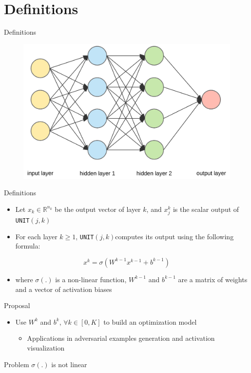 \documentclass{beamer}
\newcommand{\UNIT}{\texttt{UNIT}$(j,k)$}
\begin{document}
\section{Definitions}
\begin{frame}{Definitions}
  \begin{figure}
    \centering
    \includegraphics[width=\columnwidth]{dnn.png}
  \end{figure}
\end{frame}

\begin{frame}{Definitions}
  \begin{itemize}
  \item Let $x_k \in \mathbb{R}^{n_k}$ be the output vector of layer $k$, and $x_j^k$ is the scalar output of \UNIT
  \item For each layer $k \geq 1$, \UNIT computes its output using the following formula:
  \end{itemize}
  $$
  x^k = \sigma(W^{k-1} x^{k-1} + b^{k-1})
  $$
  \begin{itemize}
  \item where $\sigma(.)$ is a non-linear function, $W^{k-1}$ and $b^{k-1}$ are a matrix of weights and a vector of activation biases
  \end{itemize}
\end{frame}

\begin{frame}{Proposal}
  \begin{itemize}
  \item Use $W^k$ and $b^k$, $\forall k \in [0, K]$ to build an optimization model
    \begin{itemize}
    \item Applications in adversarial examples generation and activation visualization
    \end{itemize}
  \end{itemize}
  \pause
  \begin{block}{Problem}
    \centering
    $\sigma(.)$ is not linear
  \end{block}
\end{frame}
\end{document}
